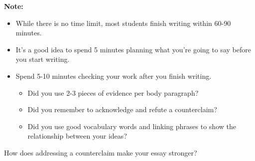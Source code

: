 \documentclass[12pt]{article}
\begin{document}
\begin{tcolorbox}[colframe=black!40, colback=gray!5, 
coltitle=black, colbacktitle=black!20, fonttitle=\bfseries\Large, 
title=Additional Notes, halign title=center, left=5pt, right=5pt, top=5pt, bottom=15pt]
\textbf{Note:}
\begin{itemize}
    \item While there is no time limit, most students finish writing within 60-90 minutes. 
    \item It's a good idea to spend 5 minutes planning what you're going to say before you start writing.
    \item Spend 5-10 minutes checking your work after you finish writing. 
    \begin{itemize}
        \item Did you use 2-3 pieces of evidence per body paragraph?
        \item Did you remember to acknowledge and refute a counterclaim?
        \item Did you use good vocabulary words and linking phrases to show the relationship between your ideas?
    \end{itemize}



\end{itemize}
\end{tcolorbox}

\vspace{1em}

\begin{tcolorbox}[colframe=black!60, colback=white, 
coltitle=black, colbacktitle=black!15, fonttitle=\bfseries\Large, 
title=Exit Ticket, halign title=center, left=10pt, right=10pt, top=10pt, bottom=15pt]
How does addressing a counterclaim make your essay stronger?
\vspace{15em}
\end{tcolorbox}
\end{document}
